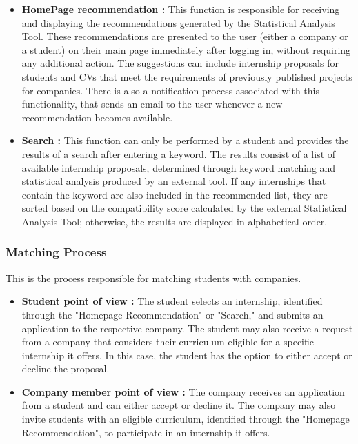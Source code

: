 \begin{itemize}
    \item \textbf{HomePage recommendation :} This function is responsible for receiving and displaying the recommendations generated by
     the Statistical Analysis Tool. These recommendations are presented to the user (either a company or a student) on their main page 
     immediately after logging in, without requiring any additional action. The suggestions can include internship proposals 
    for students and CVs that meet the requirements of previously published projects for companies. There is also a notification 
    process associated with this functionality, that sends an email to the user whenever a new recommendation becomes available.

    \item \textbf{Search :} This function can only be performed by a student and provides the results of a search after entering a keyword.
     The results consist of a list of available internship proposals, determined through keyword matching and statistical analysis 
     produced by an external tool. If any internships that contain the keyword are also included in the recommended list, they are 
     sorted based on the compatibility score calculated by the external Statistical Analysis Tool; otherwise, the results are displayed 
     in alphabetical order.
    
\end{itemize}

\subsubsection{Matching Process}

This is the process responsible for matching students with companies.

\begin{itemize}
    \item \textbf{Student point of view :} The student selects an internship, identified through the "Homepage Recommendation" or "Search," 
    and submits an application to the respective company. The student may also receive a request from a company that considers their 
    curriculum eligible for a specific internship it offers. In this case, the student has the option to either accept or decline the proposal.

    \item \textbf{Company member point of view :} The company receives an application from a student and can either accept or decline it. The company may also invite students
    with an eligible curriculum, identified through the "Homepage Recommendation", to participate in an internship it offers.
\end{itemize}

